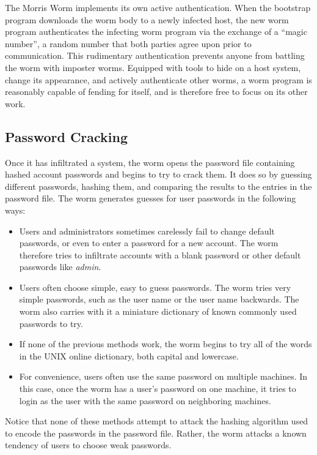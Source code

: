 The Morris Worm implements its own active authentication.
When the bootstrap program downloads the worm body to a newly infected host, the
new worm program authenticates the infecting worm program via the exchange of a
``magic number'', a random number that both parties agree upon prior to communication. 
This rudimentary authentication prevents anyone from battling the worm with
imposter worms.
Equipped with tools to hide on a host system, change its appearance, and
actively authenticate other worms, a worm program is reasonably capable of
fending for itself, and is therefore free to focus on its other work.

\subsection*{Password Cracking}
Once it has infiltrated a system, the worm opens the password file
containing hashed account passwords and begins to try to crack them. It does so
by guessing different passwords, hashing them, and comparing the results to the
entries in the password file. The worm generates guesses for user passwords in
the following ways:

\begin{itemize}
\item Users and administrators sometimes carelessly fail to change
default passwords, or even to enter a password for a new account. The worm
therefore tries to infiltrate accounts with a blank password or other
default passwords like \textit{admin}.
\item Users often choose simple, easy to
guess passwords. The worm tries very simple passwords, such as the user name or
the user name backwards. The worm also carries with it a miniature dictionary of
known commonly used passwords to try. 
\item If none of the previous methods work, the worm begins to try all
of the words in the UNIX online dictionary, both capital and lowercase.
\item For convenience, users often use the same password on multiple
machines. In this case, once the worm has a user's password on one
machine, it tries to login as the user with the same password on neighboring
machines.
\end{itemize}

Notice that none of these methods attempt to attack the hashing algorithm used
to encode the passwords in the password file. Rather, the worm attacks a known
tendency of users to choose weak passwords.


